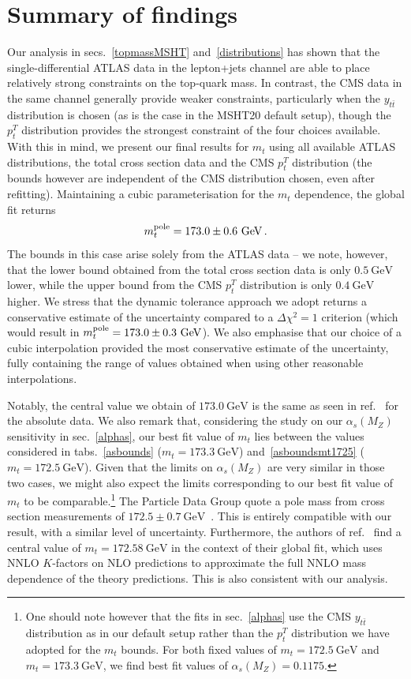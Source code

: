 \documentclass[sn-mathphys]{sn-jnl}%
\newcommand{\pT}{p^T_t}
\newcommand{\ytt}{y_{t\bar{t}}}
\newcommand{\mt}{m_t}
\newcommand{\as}{\alpha_s(M_Z)}
\newcommand{\gev}{\mathrm{GeV}}
\begin{document}
\section{Summary of findings}\label{summary}
Our analysis in secs.~\ref{topmassMSHT} and~\ref{distributions} has shown that the single-differential ATLAS data in the lepton+jets channel are able to place relatively strong constraints on the top-quark mass. In contrast, the CMS data in the same channel generally provide weaker constraints, particularly when the $\ytt$ distribution is chosen (as is the case in the MSHT20 default setup), though the $\pT$ distribution provides the strongest constraint of the four choices available. With this in mind, we present our final results for $\mt$ using all available ATLAS distributions, the total cross section data and the CMS $\pT$ distribution (the bounds however are independent of the CMS distribution chosen, even after refitting). Maintaining a cubic parameterisation for the $\mt$ dependence, the global fit returns 
\begin{equation}
    \mt^{\rm pole}=173.0\pm0.6~\gev\,.
\end{equation}
The bounds in this case arise solely from the ATLAS data -- we note, however, that the lower bound obtained from the total cross section data is only $0.5~\gev$ lower, while the upper bound from the CMS $\pT$ distribution is only $0.4~\gev$ higher. We stress that the dynamic tolerance approach we adopt returns a conservative estimate of the uncertainty compared to a $\Delta\chi^2=1$ criterion (which would result in $\mt^{\rm pole}=173.0\pm0.3~\gev$). We also emphasise that our choice of a cubic interpolation provided the most conservative estimate of the uncertainty, fully containing the range of values obtained when using other reasonable interpolations.

Notably, the central value we obtain of $173.0~\gev$ is the same as seen in ref.~\cite{Kadir:2020yml} for the absolute data. We also remark that, considering the study on our $\as$ sensitivity in sec.~\ref{alphas}, our best fit value of $\mt$ lies between the values considered in tabs.~\ref{asbounds} ($\mt=173.3~\gev$) and~\ref{asboundsmt1725} ($\mt=172.5~\gev$). Given that the limits on $\as$ are very similar in those two cases, we might also expect the limits corresponding to our best fit value of $\mt$ to be comparable.\footnote{One should note however that the fits in sec.~\ref{alphas} use the CMS $\ytt$ distribution as in our default setup rather than the $\pT$ distribution we have adopted for the $\mt$ bounds. For both fixed values of $\mt=172.5~\gev$ and $\mt=173.3~\gev$, we find best fit values of $\as=0.1175$.} The Particle Data Group quote a pole mass from cross section measurements of $172.5\pm0.7~\gev$~\cite{Workman:2022ynf}. This is entirely compatible with our result, with a similar level of uncertainty. Furthermore, the authors of ref.~\cite{Gao:2022srd} find a central value of $\mt=172.58~\gev$ in the context of their global fit, which uses NNLO $K$-factors on NLO predictions to approximate the full NNLO mass dependence of the theory predictions. This is also consistent with our analysis.
\end{document}

